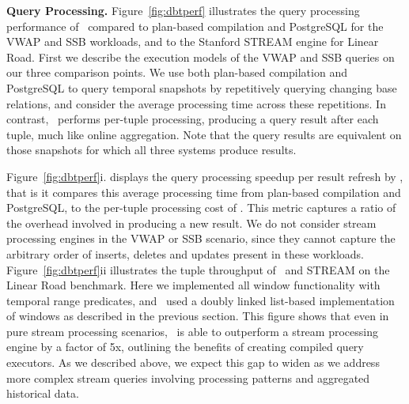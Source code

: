 \textbf{Query Processing.}
Figure~\ref{fig:dbtperf} illustrates the query processing performance of
\compiler\ compared to plan-based compilation and PostgreSQL for the VWAP and SSB
workloads, and to the Stanford STREAM engine for Linear Road. First we describe
the execution models of the VWAP and SSB queries on our three comparison points.
We use both plan-based compilation and PostgreSQL to query temporal snapshots by
repetitively querying changing base relations, and consider the average
processing time across these repetitions. In contrast, \compiler\ performs
per-tuple processing, producing a query result after each tuple, much like online
aggregation. Note that the query results are equivalent on those snapshots for
which all three systems produce results.

Figure~\ref{fig:dbtperf}i. displays the query processing speedup per result
refresh by \compiler, that is it compares this average processing time from
plan-based compilation and PostgreSQL, to the per-tuple processing cost of
\compiler. This metric captures a ratio of the overhead involved in producing a
new result. We do not consider stream processing engines in the VWAP or SSB
scenario, since they cannot capture the arbitrary order of inserts, deletes and
updates present in these workloads.
Figure~\ref{fig:dbtperf}ii illustrates the tuple throughput of \compiler\ and
STREAM on the Linear Road benchmark. Here we implemented all window functionality
with temporal range predicates, and \compiler\ used a doubly linked list-based
implementation of windows as described in the previous section. This figure shows
that even in pure stream processing scenarios, \compiler\ is able to outperform a
stream processing engine by a factor of 5x, outlining the benefits of creating
compiled query executors. As we described above, we expect this gap to widen as
we address more complex stream queries involving processing patterns and
aggregated historical data.


